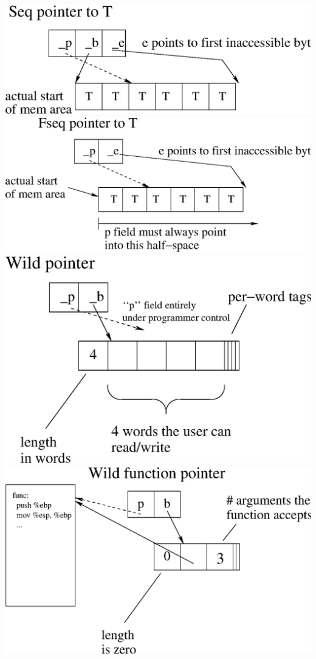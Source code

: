 \documentclass{book}
\begin{document}
\includegraphics[scale=0.7]{seq.eps}
\clearpage%
\includegraphics[scale=0.7]{fseq.eps}
\clearpage%
\includegraphics[scale=0.7]{wild.eps}
\clearpage%
\includegraphics[scale=0.7]{wild_fn.eps}
\clearpage%
\end{document}
